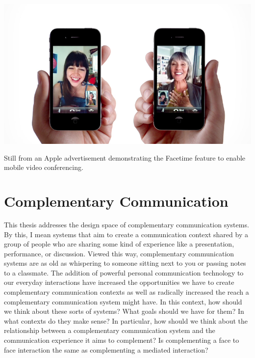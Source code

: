 



\begin{marginfigure}
	\includegraphics{figures/iphone-face-to-face.png}
	\caption{Still from an Apple advertisement demonstrating the Facetime feature to enable mobile video conferencing.}
	\label{fig:facetime}
\end{marginfigure}




\section{Complementary Communication}
This thesis addresses the design space of complementary communication systems. By this, I mean systems that aim to create a communication context shared by a group of people who are sharing some kind of experience like a presentation, performance, or discussion. Viewed this way, complementary communication systems are as old as whispering to someone sitting next to you or passing notes to a classmate. The addition of powerful personal communication technology to our everyday interactions have increased the opportunities we have to create complementary communication contexts as well as radically increased the reach a complementary communication system might have. In this context, how should we think about these sorts of systems? What goals should we have for them? In what contexts do they make sense? In particular, how should we think about the relationship between a complementary communication system and the communication experience it aims to complement? Is complementing a face to face interaction the same as complementing a mediated interaction?

